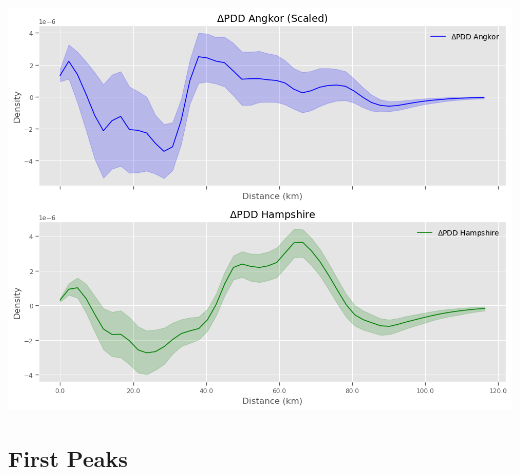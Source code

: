 \documentclass[
  11pt,
  letterpaper,
  DIV=11,
  numbers=noendperiod]{scrartcl}
\begin{document}
\includegraphics{analysis_files/figure-pdf/cell-33-output-1.png}

\subsection{First Peaks}\label{first-peaks}
\end{document}

